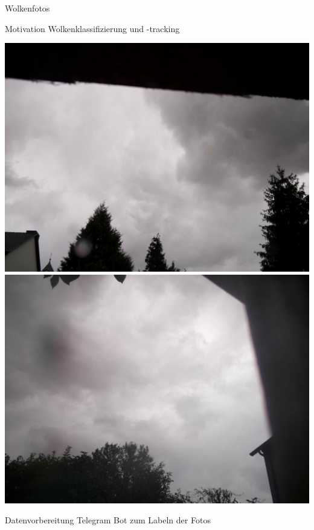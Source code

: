 \begin{frame}[t]{Wolkenfotos}
  \begin{block}{Motivation}
    Wolkenklassifizierung und -tracking

    \includegraphics[height=0.4\textheight]{picture/cloud_soelde.jpg}
    \hfill
    \includegraphics[height=0.4\textheight]{picture/cloud_brackel.jpg}
  \end{block}
  \begin{block}{Datenvorbereitung}
    Telegram Bot zum Labeln der Fotos
  \end{block}
\end{frame}
